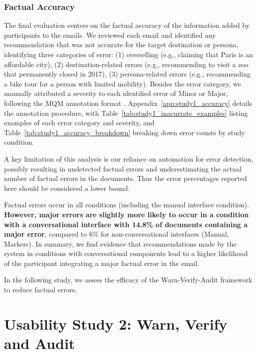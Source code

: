 \documentclass[manuscript]{acmart}
\begin{document}
\subsubsection{Factual Accuracy} \label{sec:study1_evaluation_accuracy}

The final evaluation centers on the factual accuracy of the information added by participants to the emails. We reviewed each email and identified any recommendation that was not accurate for the target destination or persona, identifying three categories of error: (1) overselling (e.g., claiming that Paris is an affordable city), (2) destination-related errors (e.g., recommending to visit a zoo that permanently closed in 2017), (3) persona-related errors (e.g., recommending a bike tour for a person with limited mobility). Besides the error category, we manually attributed a severity to each identified error of Minor or Major, following the MQM annotation format \cite{freitag2021experts}. Appendix~\ref{app:study1_accuracy} details the annotation procedure, with Table~\ref{tab:study1_inacurrate_examples} listing examples of each error category and severity, and Table~\ref{tab:study1_accuracy_breakdown} breaking down error counts by study condition.

A key limitation of this analysis is our reliance on automation for error detection, possibly resulting in undetected factual errors and underestimating the actual number of factual errors in the documents.  Thus the error percentages reported here should be considered a lower bound.

Factual errors occur in all conditions (including the manual interface condition). \textbf{However, major errors are slightly more likely to occur in a condition with a conversational interface with 14.8\% of documents containing a major error}, compared to 6\% for non-conversational interfaces (Manual, Markers). In summary, we find evidence that recommendations made by the system in conditions with conversational components lead to a higher likelihood of the participant integrating a major factual error in the email.

In the following study, we assess the efficacy of the Warn-Verify-Audit framework to reduce factual errors.

\section{Usability Study 2: Warn, Verify and Audit} \label{sec:study2}
\end{document}
